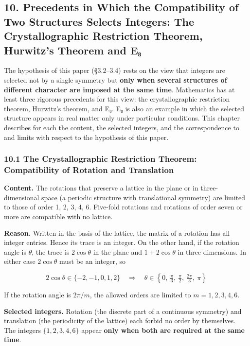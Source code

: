 \documentclass[
  a4paper,
]{article}
\begin{document}
\subsection{10. Precedents in Which the Compatibility of Two Structures
Selects Integers: The Crystallographic Restriction Theorem, Hurwitz's
Theorem and
E₈}\label{precedents-in-which-the-compatibility-of-two-structures-selects-integers-the-crystallographic-restriction-theorem-hurwitzs-theorem-and-eux2088}

The hypothesis of this paper (§3.2--3.4) rests on the view that integers
are selected not by a single symmetry but \textbf{only when several
structures of different character are imposed at the same time}.
Mathematics has at least three rigorous precedents for this view: the
crystallographic restriction theorem, Hurwitz's theorem, and E₈. E₈ is
also an example in which the selected structure appears in real matter
only under particular conditions. This chapter describes for each the
content, the selected integers, and the correspondence to and limits
with respect to the hypothesis of this paper.

\subsubsection{10.1 The Crystallographic Restriction Theorem:
Compatibility of Rotation and
Translation}\label{the-crystallographic-restriction-theorem-compatibility-of-rotation-and-translation}

\textbf{Content.} The rotations that preserve a lattice in the plane or
in three-dimensional space (a periodic structure with translational
symmetry) are limited to those of order 1, 2, 3, 4, 6. Five-fold
rotations and rotations of order seven or more are compatible with no
lattice.

\textbf{Reason.} Written in the basis of the lattice, the matrix of a
rotation has all integer entries. Hence its trace is an integer. On the
other hand, if the rotation angle is \(\theta\), the trace is
\(2\cos\theta\) in the plane and \(1+2\cos\theta\) in three dimensions.
In either case \(2\cos\theta\) must be an integer, so

\[
2\cos\theta\in\{-2,-1,0,1,2\}
\quad\Longrightarrow\quad
\theta\in\left\{0,\ \tfrac{\pi}{3},\ \tfrac{\pi}{2},\ \tfrac{2\pi}{3},\ \pi\right\}
\tag{13}
\]

If the rotation angle is \(2\pi/m\), the allowed orders are limited to
\(m=1,2,3,4,6\).

\textbf{Selected integers.} Rotation (the discrete part of a continuous
symmetry) and translation (the periodicity of the lattice) each forbid
no order by themselves. The integers \(\{1,2,3,4,6\}\) appear
\textbf{only when both are required at the same time}.
\end{document}
